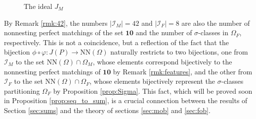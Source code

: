 \documentclass[11pt]{amsart}
\theoremstyle{plain}
\theoremstyle{definition}
\theoremstyle{remark}
\numberwithin{equation}{section}
\newcommand{\ra}{\rightarrow}
\newcommand{\cali}{\mathcal{I}}
\newcommand{\ten}{\mathbf{10}}
\newcommand{\ob}{\Omega}
\newcommand{\fob}{\Omega_F}
\newcommand{\mob}{\Omega_M}
\newcommand{\nn}{\mathrm{NN}}
\newcommand{\abs}[1]{\lvert #1 \rvert}
\begin{document}
\begin{figure}[h!]
    \caption{The ideal $J_M$}
    \label{fig:a4}
\end{figure}

By Remark \ref{rmk:42}, the numbers $\abs{\cali_M}=42$ and $\abs{\cali_F}=8$ are
also the number of nonnesting perfect matchings of the set $\ten$ and the number
of $\sigma$-classes in $\fob$, respectively. This is not a coincidence, but a
reflection of the fact that the bijection $\phi\circ\varphi: J(P)\ra \nn(\ob)$
naturally restricts to two bijections, one from $\cali_M$ to the set
$\nn(\ob)\cap \mob$, whose elements correspond bijectively to the nonnesting
perfect matchings of $\ten$ by Remark \ref{rmk:features}, and the other from
$\cali_F$ to the set $\nn(\ob)\cap \fob$, whose elements bijectively represent
the $\sigma$-classes partitioning $\fob$ by Proposition \ref{prop:Sigma}. This
fact, which will be proved soon in Proposition \ref{prop:seq_to_sum}, is a
crucial connection between the results of Section \ref{sec:sums} and the theory
of sections \ref{sec:mob} and \ref{sec:fob}. 
\end{document}
